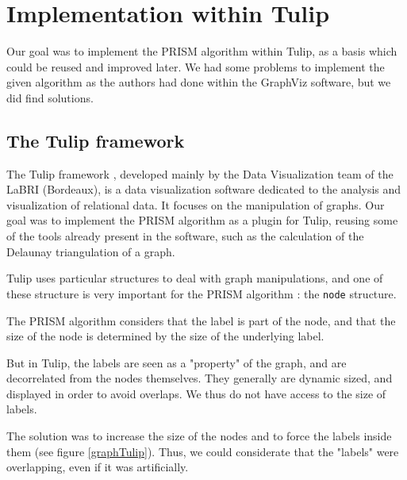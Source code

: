 \documentclass[12pt]{report}
\begin{document}
\chapter{Implementation within Tulip}

Our goal was to implement the PRISM algorithm within Tulip, as a basis which could be reused and improved later. We had some problems to implement the given algorithm as the authors had done within the GraphViz \cite{Gansner02} software, but we did find solutions.

\section{The Tulip framework}

The Tulip framework \cite{Auber12}, developed mainly by the Data Visualization team of the LaBRI (Bordeaux), is a data visualization software dedicated to the analysis and visualization of relational data. It focuses on the manipulation of graphs. Our goal was to implement the PRISM algorithm as a plugin for Tulip, reusing some of the tools already present in the software, such as the calculation of the Delaunay triangulation of a graph.

Tulip uses particular structures to deal with graph manipulations, and one of these structure is very important for the PRISM algorithm : the \texttt{node} structure.

The PRISM algorithm considers that the label is part of the node, and that the size of the node is determined by the size of the underlying label.

But in Tulip, the labels are seen as a "property" of the graph, and are decorrelated from the nodes themselves. They generally are dynamic sized, and displayed in order to avoid overlaps. We thus do not have access to the size of labels.

The solution was to increase the size of the nodes and to force the labels inside them (see figure \ref{graphTulip}). Thus, we could considerate that the "labels" were overlapping, even if it was artificially.
\end{document}
